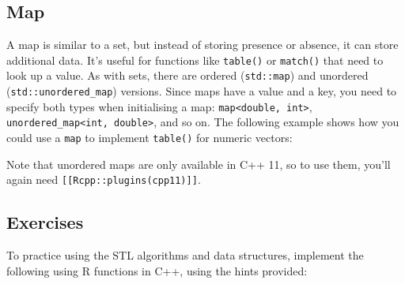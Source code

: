\hypertarget{map}{%
\subsection{Map}\label{map}}

A map is similar to a set, but instead of storing presence or absence,
it can store additional data. It's useful for functions like
\texttt{table()} or \texttt{match()} that need to look up a value. As
with sets, there are ordered (\texttt{std::map}) and unordered
(\texttt{std::unordered\_map}) versions. Since maps have a value and a
key, you need to specify both types when initialising a map:
\texttt{map\textless{}double,\ int\textgreater{}},
\texttt{unordered\_map\textless{}int,\ double\textgreater{}}, and so on.
The following example shows how you could use a \texttt{map} to
implement \texttt{table()} for numeric vectors: 

\begin{Shaded}
\begin{Highlighting}[]
 

\NormalTok{, }
  \NormalTok{, }

  \NormalTok{ (}
\NormalTok{  \}}

\NormalTok{\}}
\end{Highlighting}
\end{Shaded}

Note that unordered maps are only available in C++ 11, so to use them,
you'll again need \texttt{{[}{[}Rcpp::plugins(cpp11){]}{]}}.

\hypertarget{exercises-2}{%
\subsection{Exercises}\label{exercises-2}}

To practice using the STL algorithms and data structures, implement the
following using R functions in C++, using the hints provided:

